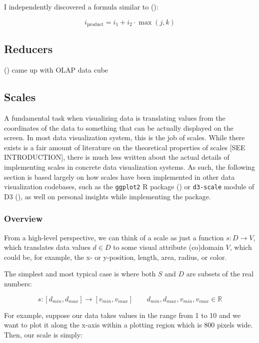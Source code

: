 \documentclass[
]{book}
\theoremstyle{definition}
\theoremstyle{definition}
\theoremstyle{definition}
\theoremstyle{definition}
\theoremstyle{remark}
\begin{document}
I independently discovered a formula similar to ():

\[i_{\text{product}} = i_1 + i_2 \cdot \max(j, k)\]

\subsection{Reducers}\label{reducers}

() came up with OLAP data cube

\subsection{Scales}\label{scales-1}

A fundamental task when visualizing data is translating values from the coordinates of the data to something that can be actually displayed on the screen. In most data visualization system, this is the job of scales. While there exists is a fair amount of literature on the theoretical properties of scales {[}SEE INTRODUCTION{]}, there is much less written about the actual details of implementing scales in concrete data visualization systems. As such, the following section is based largely on how scales have been implemented in other data visualization codebases, such as the \texttt{ggplot2} R package () or \texttt{d3-scale} module of D3 (), as well on personal insights while implementing the package.

\subsubsection{Overview}\label{overview}

From a high-level perspective, we can think of a scale as just a function \(s: D \to V\), which translates data values \(d \in D\) to some visual attribute (co)domain \(V\), which could be, for example, the x- or y-position, length, area, radius, or color.

The simplest and most typical case is where both \(S\) and \(D\) are subsets of the real numbers:

\[s: [d_{min}, d_{max}] \to [v_{min}, v_{max}] \qquad d_{min}, d_{max}, v_{min}, v_{max} \in \mathbb{R}\]

For example, suppose our data takes values in the range from 1 to 10 and we want to plot it along the x-axis within a plotting region which is 800 pixels wide. Then, our scale is simply:
\end{document}
